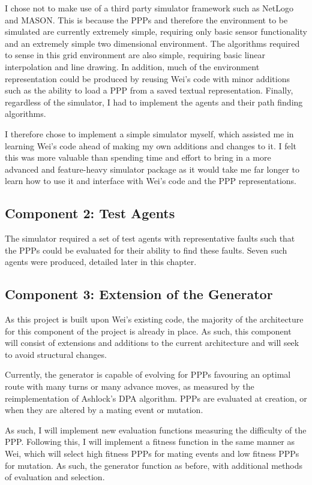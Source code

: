 \documentclass[authoryearcitations]{UoYCSproject}
\begin{document}
I chose not to make use of a third party simulator framework such as NetLogo and MASON. This is because the PPPs and therefore the environment to be simulated are currently extremely simple, requiring only basic sensor functionality and an extremely simple two dimensional environment. The algorithms required to sense in this grid environment are also simple, requiring basic linear interpolation and line drawing. In addition, much of the environment representation could be produced by reusing Wei's code with minor additions such as the ability to load a PPP from a saved textual representation. Finally, regardless of the simulator, I had to implement the agents and their path finding algorithms.

I therefore chose to implement a simple simulator myself, which assisted me in learning Wei's code ahead of making my own additions and changes to it. I felt this was more valuable than spending time and effort to bring in a more advanced and feature-heavy simulator package as it would take me far longer to learn how to use it and interface with Wei's code and the PPP representations.

\subsection{Component 2: Test Agents}
\label{sec:da_3_2}

The simulator required a set of test agents with representative faults such that the PPPs could be evaluated for their ability to find these faults. Seven such agents were produced, detailed later in this chapter.

\subsection{Component 3: Extension of the Generator}
\label{sec:da_3_3}
As this project is built upon Wei's existing code, the majority of the architecture for this component of the project is already in place. As such, this component will consist of extensions and additions to the current architecture and will seek to avoid structural changes.

Currently, the generator is capable of evolving for PPPs favouring an optimal route with many turns or many advance moves, as measured by the reimplementation of Ashlock's DPA algorithm. PPPs are evaluated at creation, or when they are altered by a mating event or mutation.

As such, I will implement new evaluation functions measuring the difficulty of the PPP. Following this, I will implement a fitness function in the same manner as Wei, which will select high fitness PPPs for mating events and low fitness PPPs for mutation. As such, the generator function as before, with additional methods of evaluation and selection.
\end{document}
